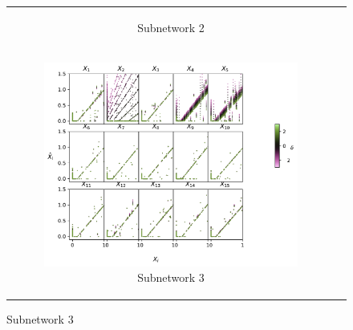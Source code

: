 \documentclass{article}
\theoremstyle{plain}
\theoremstyle{definition}
\theoremstyle{remark}
\begin{document}
\begin{figure}[ht]
\begin{minipage}{\textwidth}
\begin{tabular}{cc}
\begin{subfigure}{0.3\textwidth}
                \caption{Subnetwork 2}
            \end{subfigure} \\ %
            \begin{subfigure}{0.3\textwidth}
                \centering
                \includegraphics[width=\linewidth]{../figures/s4_tms_intervention_network3.pdf}
                \caption{Subnetwork 3}
            \end{subfigure} & %
            

\end{tabular}
\end{minipage}
\end{figure}
\end{document}
